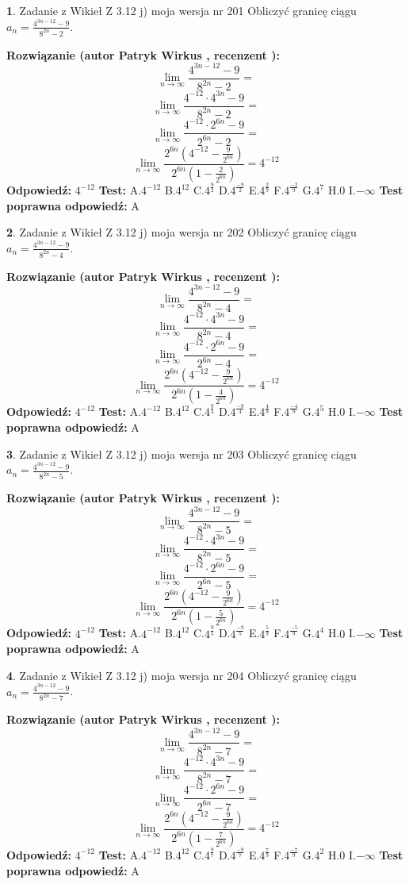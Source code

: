 \documentclass[12pt, a4paper]{article}
\theoremstyle{definition} %
\newtheorem{zad}{}
\newcommand{\zadStart}[1]{\begin{zad}#1\newline}
\newcommand{\zadStop}{\end{zad}}
\newcommand{\rozwStart}[2]{\noindent \textbf{Rozwiązanie (autor #1 , recenzent #2): }\newline}
\newcommand{\rozwStop}{\newline}
\newcommand{\odpStart}{\noindent \textbf{Odpowiedź:}\newline}
\newcommand{\odpStop}{\newline}
\newcommand{\testStart}{\noindent \textbf{Test:}\newline}
\newcommand{\testStop}{\newline}
\newcommand{\kluczStart}{\noindent \textbf{Test poprawna odpowiedź:}\newline}
\newcommand{\kluczStop}{\newline}
\begin{document}
\zadStart{Zadanie z Wikieł Z 3.12 j) moja wersja nr 201}
Obliczyć granicę ciągu $a_{n}=\frac{4^{3n-12}-9}{8^{2n}-2}$.
\zadStop
\rozwStart{Patryk Wirkus}{}
$$\lim\limits_{n\to\infty}\frac{4^{3n-12}-9}{8^{2n}-2}=$$
$$\lim\limits_{n\to\infty}\frac{4^{-12} \cdot 4^{3n}-9}{8^{2n}-2}=$$
$$\lim\limits_{n\to\infty}\frac{4^{-12} \cdot 2^{6n}-9}{2^{6n}-2}=$$
$$\lim\limits_{n\to\infty}\frac{2^{6n}(4^{-12} - \frac{9}{2^{6n}})}{2^{6n}(1-\frac{2}{2^{6n}})}= 4^{-12}$$
\rozwStop
\odpStart
$4^{-12}$
\odpStop
\testStart
A.$4^{-12}$
B.$4^{12}$
C.$4^{\frac{9}{2}}$
D.$4^{\frac{-9}{2}}$
E.$4^{\frac{2}{9}}$
F.$4^{\frac{-2}{9}}$
G.$4^{7}$
H.$0$
I.$-\infty$
\testStop
\kluczStart
A
\kluczStop



\zadStart{Zadanie z Wikieł Z 3.12 j) moja wersja nr 202}
Obliczyć granicę ciągu $a_{n}=\frac{4^{3n-12}-9}{8^{2n}-4}$.
\zadStop
\rozwStart{Patryk Wirkus}{}
$$\lim\limits_{n\to\infty}\frac{4^{3n-12}-9}{8^{2n}-4}=$$
$$\lim\limits_{n\to\infty}\frac{4^{-12} \cdot 4^{3n}-9}{8^{2n}-4}=$$
$$\lim\limits_{n\to\infty}\frac{4^{-12} \cdot 2^{6n}-9}{2^{6n}-4}=$$
$$\lim\limits_{n\to\infty}\frac{2^{6n}(4^{-12} - \frac{9}{2^{6n}})}{2^{6n}(1-\frac{4}{2^{6n}})}= 4^{-12}$$
\rozwStop
\odpStart
$4^{-12}$
\odpStop
\testStart
A.$4^{-12}$
B.$4^{12}$
C.$4^{\frac{9}{4}}$
D.$4^{\frac{-9}{4}}$
E.$4^{\frac{4}{9}}$
F.$4^{\frac{-4}{9}}$
G.$4^{5}$
H.$0$
I.$-\infty$
\testStop
\kluczStart
A
\kluczStop



\zadStart{Zadanie z Wikieł Z 3.12 j) moja wersja nr 203}
Obliczyć granicę ciągu $a_{n}=\frac{4^{3n-12}-9}{8^{2n}-5}$.
\zadStop
\rozwStart{Patryk Wirkus}{}
$$\lim\limits_{n\to\infty}\frac{4^{3n-12}-9}{8^{2n}-5}=$$
$$\lim\limits_{n\to\infty}\frac{4^{-12} \cdot 4^{3n}-9}{8^{2n}-5}=$$
$$\lim\limits_{n\to\infty}\frac{4^{-12} \cdot 2^{6n}-9}{2^{6n}-5}=$$
$$\lim\limits_{n\to\infty}\frac{2^{6n}(4^{-12} - \frac{9}{2^{6n}})}{2^{6n}(1-\frac{5}{2^{6n}})}= 4^{-12}$$
\rozwStop
\odpStart
$4^{-12}$
\odpStop
\testStart
A.$4^{-12}$
B.$4^{12}$
C.$4^{\frac{9}{5}}$
D.$4^{\frac{-9}{5}}$
E.$4^{\frac{5}{9}}$
F.$4^{\frac{-5}{9}}$
G.$4^{4}$
H.$0$
I.$-\infty$
\testStop
\kluczStart
A
\kluczStop



\zadStart{Zadanie z Wikieł Z 3.12 j) moja wersja nr 204}
Obliczyć granicę ciągu $a_{n}=\frac{4^{3n-12}-9}{8^{2n}-7}$.
\zadStop
\rozwStart{Patryk Wirkus}{}
$$\lim\limits_{n\to\infty}\frac{4^{3n-12}-9}{8^{2n}-7}=$$
$$\lim\limits_{n\to\infty}\frac{4^{-12} \cdot 4^{3n}-9}{8^{2n}-7}=$$
$$\lim\limits_{n\to\infty}\frac{4^{-12} \cdot 2^{6n}-9}{2^{6n}-7}=$$
$$\lim\limits_{n\to\infty}\frac{2^{6n}(4^{-12} - \frac{9}{2^{6n}})}{2^{6n}(1-\frac{7}{2^{6n}})}= 4^{-12}$$
\rozwStop
\odpStart
$4^{-12}$
\odpStop
\testStart
A.$4^{-12}$
B.$4^{12}$
C.$4^{\frac{9}{7}}$
D.$4^{\frac{-9}{7}}$
E.$4^{\frac{7}{9}}$
F.$4^{\frac{-7}{9}}$
G.$4^{2}$
H.$0$
I.$-\infty$
\testStop
\kluczStart
A
\kluczStop
\end{document}
